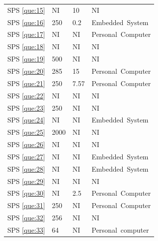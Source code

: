 \documentclass[sensors,review,accept,moreauthors,pdftex]{Definitions/mdpi}
\begin{document}
\begin{table}[H]
\begin{tabular}{p{33pt}p{40pt}p{40pt}p{100pt}}
		SPS \ref{que:15}	&	NI	&	10	&	NI	\\
		
		SPS \ref{que:16}	&	250	&	0.2	&	Embedded~System	\\
		
		SPS \ref{que:17}	&	NI	&	NI	&	Personal~Computer	\\
		
		SPS \ref{que:18}	&	NI	&	NI	&	NI	\\
		
		SPS \ref{que:19}	&	500	&	NI	&	NI	\\
		
		SPS \ref{que:20}	&	285	&	15	&	Personal~Computer	\\
		
		SPS \ref{que:21}	&	250	&	7.57	&	Personal~Computer	\\
		
		SPS \ref{que:22}	&	NI	&	NI	&	NI	\\
		
		SPS \ref{que:23}	&	250	&	NI	&	NI	\\
		
		SPS \ref{que:24}	&	NI	&	NI	&	Embedded~System	\\
		
		SPS \ref{que:25}	&	2000	&	NI	&	NI	\\
		
		SPS \ref{que:26}	&	NI	&	NI	&	NI	\\
		
		SPS \ref{que:27}	&	NI	&	NI	&	Embedded~System	\\
		
		SPS \ref{que:28}	&	NI	&	NI	&	Embedded~System	\\
		
		SPS \ref{que:29}	&	NI	&	NI	&	NI	\\
		
		SPS \ref{que:30}	&	NI	&	2.5	&	Personal~Computer	\\
		
		SPS \ref{que:31}	&	250	&	NI	&	Personal~Computer	\\
		
		SPS \ref{que:32}	&	256	&	NI	&	NI	\\
		
		SPS \ref{que:33}	&	64	&	NI	&	Personal~computer	\\
				

\end{tabular}
\end{table}
\end{document}
